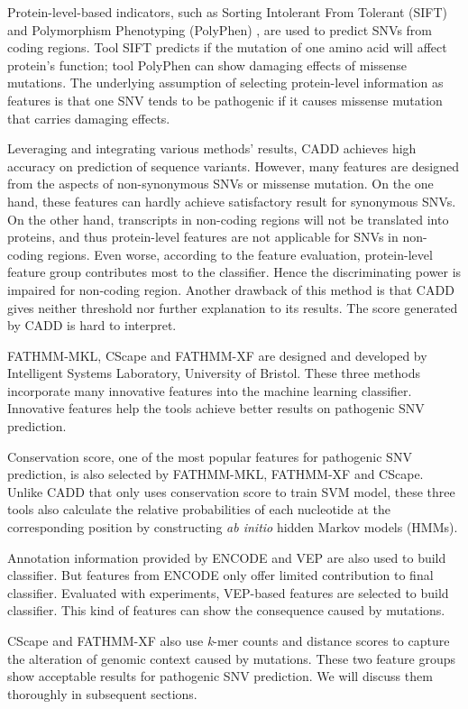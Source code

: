 \documentclass[a4paper,nohyper,nobib,openany,justified]{tufte-book}
\begin{document}
\begin{fullwidth}
Protein-level-based indicators, such as Sorting Intolerant From Tolerant (SIFT) \cite{Ng2003} and Polymorphism Phenotyping (PolyPhen) \cite{Adzhubei2010}, are used to predict SNVs from coding regions. Tool SIFT predicts if the mutation of one amino acid will affect protein's function; tool PolyPhen can show damaging effects of missense mutations. The underlying assumption of selecting protein-level information as features is that one SNV tends to be pathogenic if it causes missense mutation that carries damaging effects.

Leveraging and integrating various methods' results, CADD achieves high accuracy on prediction of sequence variants. However, many features are designed from the aspects of non-synonymous SNVs or missense mutation. On the one hand, these features can hardly achieve satisfactory result for synonymous SNVs. On the other hand, transcripts in non-coding regions will not be translated into proteins, and thus protein-level features are not applicable for SNVs in non-coding regions. Even worse, according to the feature evaluation, protein-level feature group contributes most to the classifier. Hence the discriminating power is impaired for non-coding region. Another drawback of this method is that CADD gives neither threshold nor further explanation to its results. The score generated by CADD is hard to interpret.

FATHMM-MKL, CScape and FATHMM-XF are designed and developed by Intelligent Systems Laboratory, University of Bristol. These three methods incorporate many innovative features into the machine learning classifier. Innovative features help the tools achieve better results on pathogenic SNV prediction.

Conservation score, one of the most popular features for pathogenic SNV prediction, is also selected by FATHMM-MKL, FATHMM-XF and CScape. Unlike CADD that only uses conservation score to train SVM model, these three tools also calculate the relative probabilities of each nucleotide at the corresponding position by constructing \emph{ab initio} hidden Markov models (HMMs).

Annotation information provided by ENCODE and VEP are also used to build classifier. But features from ENCODE only offer limited contribution to final classifier. Evaluated with experiments, VEP-based features are selected to build classifier. This kind of features can show the consequence caused by mutations.

CScape and FATHMM-XF also use \emph{k}-mer counts and distance scores to capture the alteration of genomic context caused by mutations. These two feature groups show acceptable results for pathogenic SNV prediction. We will discuss them thoroughly in  subsequent sections.


\end{fullwidth}
\end{document}
